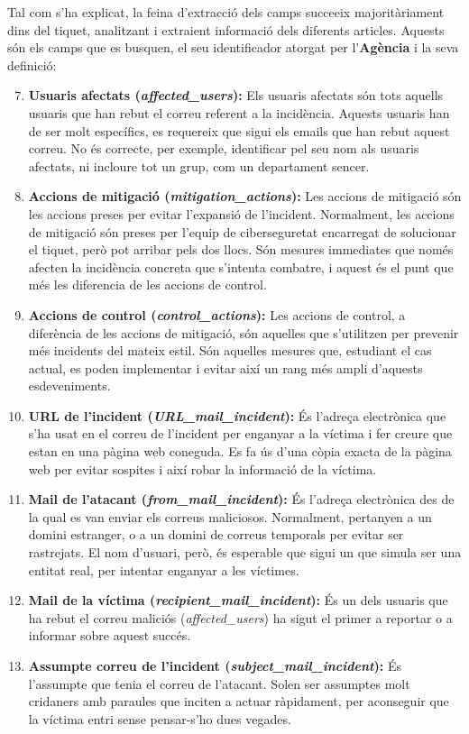 Tal com s'ha explicat, la feina d'extracció dels camps succeeix majoritàriament dins del tiquet, analitzant i extraient informació dels diferents articles. Aquests són els camps que es busquen, el seu identificador atorgat per l'\textbf{Agència} i la seva definició: 
\begin{enumerate}
  \setcounter{enumi}{6}
  \item \textbf{Usuaris afectats (\textit{affected\_users}):} Els usuaris afectats són tots aquells usuaris que han rebut el correu referent a la incidència. Aquests usuaris han de ser molt específics, es requereix que sigui els emails que han rebut aquest correu. No és correcte, per exemple, identificar pel seu nom als usuaris afectats, ni incloure tot un grup, com un departament sencer.
  \item \textbf{Accions de mitigació (\textit{mitigation\_actions}):} Les accions de mitigació són les accions preses per evitar l'expansió de l'incident. Normalment, les accions de mitigació són preses per l'equip de ciberseguretat encarregat de solucionar el tiquet, però pot arribar pels dos llocs. Són mesures immediates que només afecten la incidència concreta que s'intenta combatre, i aquest és el punt que més les diferencia de les accions de control.
  \item \textbf{Accions de control (\textit{control\_actions}):} Les accions de control, a diferència de les accions de mitigació, són aquelles que s'utilitzen per prevenir més incidents del mateix estil. Són aquelles mesures que, estudiant el cas actual, es poden implementar i evitar així un rang més ampli d'aquests esdeveniments.
  \item \textbf{URL de l'incident (\textit{URL\_mail\_incident}):} És l'adreça electrònica que s'ha usat en el correu de l'incident per enganyar a la víctima i fer creure que estan en una pàgina web coneguda. Es fa ús d'una còpia exacta de la pàgina web per evitar sospites i així robar la informació de la víctima.
  \item \textbf{Mail de l'atacant (\textit{from\_mail\_incident}):} És l'adreça electrònica des de la qual es van enviar els correus maliciosos. Normalment, pertanyen a un domini estranger, o a un domini de correus temporals per evitar ser rastrejats. El nom d'usuari, però, és esperable que sigui un que simula ser una entitat real, per intentar enganyar a les víctimes.
  \item \textbf{Mail de la víctima (\textit{recipient\_mail\_incident}):} És un dels usuaris que ha rebut el correu maliciós (\textit{affected\_users}) ha sigut el primer a reportar o a informar sobre aquest succés.
  \item \textbf{Assumpte correu de l'incident (\textit{subject\_mail\_incident}):} És l'assumpte que tenia el correu de l'atacant. Solen ser assumptes molt cridaners amb paraules que inciten a actuar ràpidament, per aconseguir que la víctima entri sense pensar-s'ho dues vegades.
\end{enumerate}

